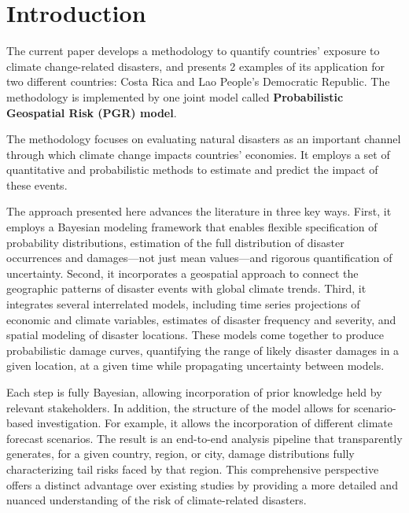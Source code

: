 
\section{Introduction}
\label{sec:introduction}

The current paper develops a methodology to quantify countries' exposure to climate change-related disasters, and presents 2 examples of its application for two different countries: Costa Rica and Lao People's Democratic Republic. The methodology is implemented by one joint model called \textbf{Probabilistic Geospatial Risk (PGR) model}.

The methodology focuses on evaluating natural disasters as an important channel through which climate change impacts countries' economies. It employs a set of quantitative and probabilistic methods to estimate and predict the impact of these events.

The approach presented here advances the literature in three key ways. First, it employs a Bayesian modeling framework that enables flexible specification of probability distributions, estimation of the full distribution of disaster occurrences and damages---not just mean values---and rigorous quantification of uncertainty. Second, it incorporates a geospatial approach to connect the geographic patterns of disaster events with global climate trends. Third, it integrates several interrelated models, including time series projections of economic and climate variables, estimates of disaster frequency and severity, and spatial modeling of disaster locations. These models come together to produce probabilistic damage curves, quantifying the range of likely disaster damages in a given location, at a given time while propagating uncertainty between models.

Each step is fully Bayesian, allowing incorporation of prior knowledge held by relevant stakeholders. In addition, the structure of the model allows for scenario-based investigation. For example, it allows the incorporation of different climate forecast scenarios. The result is an end-to-end analysis pipeline that transparently generates, for a given country, region, or city, damage distributions fully characterizing tail risks faced by that region. This comprehensive perspective offers a distinct advantage over existing studies by providing a more detailed and nuanced understanding of the risk of climate-related disasters.

\newpage
